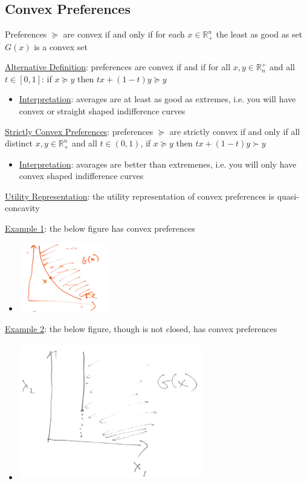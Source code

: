 \documentclass{article}
\begin{document}
\subsection{Convex Preferences}
Preferences $\succeq$ are convex if and only if for each $x \in \mathbb{R}_{+}^{n}$ the least as good as set $G(x)$ is a convex set \par \vspace{0.3em}
  \underline{Alternative Definition}: preferences are convex if and if for all $x, y \in \mathbb{R}_{n}^{+}$ and all $t \in [0,1]$: if $x \succeq y$ then $tx + (1-t)y \succeq y$
  \begin{itemize}
    \item  \underline{Interpretation}: averages are at least as good as extremes, i.e. you will have convex or straight shaped indifference curves
  \end{itemize}
  \par
  \underline{Strictly Convex Preferences}: preferences $\succeq$ are strictly convex if and only if all distinct $x,y \in \mathbb{R}_{+}^{n}$ and all $t \in (0,1)$, if $x \succeq y$ then $tx + (1-t)y \succ y$
  \begin{itemize}
    \item  \underline{Interpretation}: avarages are better than extremenes, i.e. you will only have convex shaped indifference curves
  \end{itemize}
  \par
  \underline{Utility Representation}: the utility representation of convex preferences is quasi-concavity
  \par
  \underline{Example 1}: the below figure has convex preferences
  \begin{itemize}
    \item  \includegraphics[width=4cm, height=3cm]{pic16}
  \end{itemize}
  \par
  \underline{Example 2}: the below figure, though is not closed, has convex preferences
  \begin{itemize}
    \item  \includegraphics[width=8cm, height=6cm]{pic17}
  \end{itemize}
  \par
\vspace{6mm}
\end{document}
